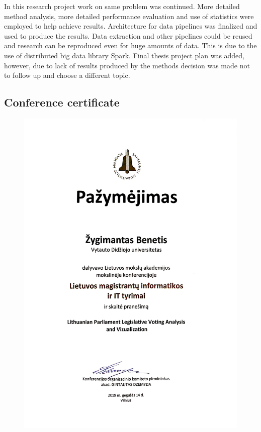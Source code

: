 \documentclass[a4paper,12pt]{article}
\begin{document}
	\vspace{5mm}
	
	In this research project work on same problem was continued. More detailed method analysis, more detailed performance evaluation and use of statistics were employed to help achieve results. Architecture for data pipelines was finalized and used to produce the results. Data extraction and other pipelines could be reused and research can be reproduced even for huge amounts of data. This is due to the use of distributed big data library Spark. Final thesis project plan was added, however, due to lack of results produced by the methods decision was made not to follow up and choose a different topic.
	
	\clearpage
	
	\subsection{Conference certificate}
	
	\begin{figure}[H]	
		\centering
		\includegraphics[width=12.5cm]{images/conference.jpg}
		\label{fig:conference}
	\end{figure}
	
\end{document}
